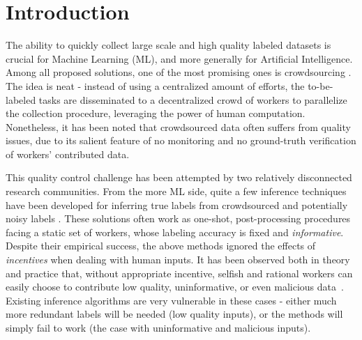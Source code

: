 \section{Introduction}
The ability to quickly collect large scale and high quality labeled datasets is crucial for Machine Learning (ML), and more generally for Artificial Intelligence. Among all proposed solutions, one of the most promising ones is crowdsourcing \cite{Howe2006,slivkins2014online,difallah2015dynamics,simpson2015language}. The idea is neat - instead of using a centralized amount of efforts, the to-be-labeled tasks are disseminated to a decentralized crowd of workers to parallelize the collection procedure, leveraging the power of human computation. Nonetheless, it has been noted that crowdsourced data often suffers from quality issues, due to its salient feature of no monitoring and no ground-truth verification of workers' contributed data. %

This quality control challenge has been attempted by two relatively disconnected research communities. From the more ML side, quite a few inference techniques have been developed for inferring true labels from crowdsourced and potentially noisy labels \citep{raykar2010learning,liu2012variational,zhou2014aggregating,zheng2017truth}. These solutions often work as one-shot, post-processing procedures facing a static set of workers, whose labeling accuracy is fixed and \emph{informative}. Despite their empirical success, the above methods ignored the effects of \emph{incentives} when dealing with human inputs. It has been observed both in theory and practice that, without appropriate incentive, selfish and rational workers can easily choose to contribute low quality, uninformative, or even malicious data~\citep{sheng2008get,liu2017sequential}. Existing inference algorithms are very vulnerable in these cases - either much more redundant labels will be needed (low quality inputs), or the methods will simply fail to work (the case with uninformative and malicious inputs). 

